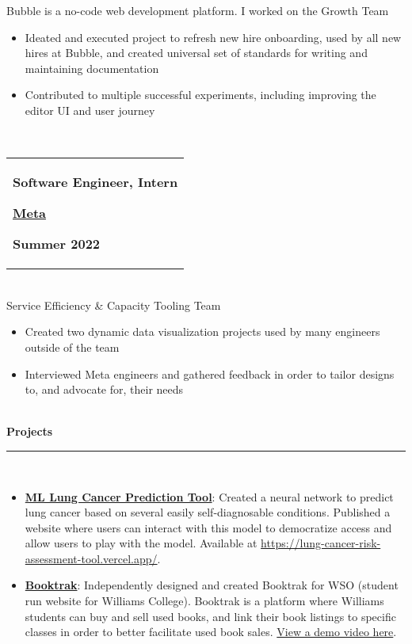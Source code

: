 \documentclass[10pt]{extarticle}
\begin{document}
Bubble is a no-code web development platform. I worked on the Growth Team \\ 
\vspace{-\baselineskip}
\begin{itemize}[noitemsep,nolistsep]
\item Ideated and executed project to refresh new hire onboarding, used by all new hires at Bubble, and created universal set of standards for writing and maintaining documentation 
\item Contributed to multiple successful experiments, including improving the editor UI and user journey 
\end{itemize}~\\[-1ex]
\begin{tabular}{@{}p{\textwidth}}\begin{minipage}[t]{0.333\textwidth}
\raggedright
\textbf{Software Engineer, Intern}
\end{minipage}%
\begin{minipage}[t]{0.333\textwidth}
\centering
\textbf{\underline{Meta}}
\end{minipage}%
\begin{minipage}[t]{0.333\textwidth}
\raggedleft
\textbf{Summer 2022}
\end{minipage}%
\end{tabular}\\[0.5ex]
Service Efficiency \& Capacity Tooling Team \\ 
\vspace{-\baselineskip}
\begin{itemize}[noitemsep,nolistsep]
\item Created two dynamic data visualization projects used by many engineers outside of the team 
\item Interviewed Meta engineers and gathered feedback in order to tailor designs to, and advocate for, their needs 
\end{itemize}~\\[-1ex]
\textbf{Projects }\\[-2ex]
\rule{\textwidth}{0.4pt}\\ 
\vspace{-\baselineskip}
\begin{itemize}[noitemsep,nolistsep]
\item \textbf{\underline{ML Lung Cancer Prediction Tool}}: Created a neural network to predict lung cancer based on several easily self-diagnosable conditions. Published a website where users can interact with this model to democratize access and allow users to play with the model. Available at \url{https://lung-cancer-risk-assessment-tool.vercel.app/}. 
\item \textbf{\underline{Booktrak}}: Independently designed and created Booktrak for WSO (student run website for Williams College). Booktrak is a platform where Williams students can buy and sell used books, and link their book listings to specific classes in order to better facilitate used book sales. \href{https://drive.google.com/file/d/1y5jxcYpGfvBr2p4P4GuF56aErHf5KXS2/view?usp=sharing}{View a demo video here}.
\end{itemize}
\end{document}
